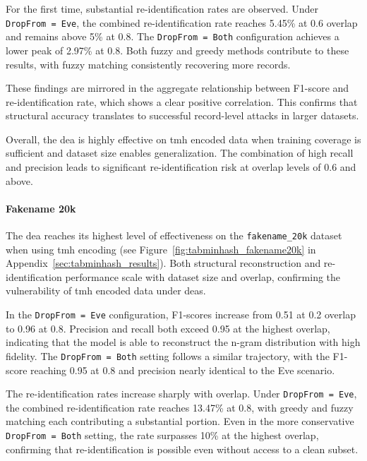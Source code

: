 For the first time, substantial re-identification rates are observed.
Under \texttt{DropFrom = Eve}, the combined re-identification rate reaches 5.45\% at 0.6 overlap and remains above 5\% at 0.8.
The \texttt{DropFrom = Both} configuration achieves a lower peak of 2.97\% at 0.8.
Both fuzzy and greedy methods contribute to these results, with fuzzy matching consistently recovering more records.

These findings are mirrored in the aggregate relationship between F1-score and re-identification rate, which shows a clear positive correlation. This confirms that structural accuracy translates to successful record-level attacks in larger datasets.



Overall, the \ac{dea} is highly effective on \ac{tmh} encoded data when training coverage is sufficient and dataset size enables generalization.
The combination of high recall and precision leads to significant re-identification risk at overlap levels of 0.6 and above.


\paragraph{Fakename 20k}

The \ac{dea} reaches its highest level of effectiveness on the \texttt{fakename\_20k} dataset when using \ac{tmh} encoding (see Figure~\ref{fig:tabminhash_fakename20k} in Appendix~\ref{sec:tabminhash_results}).
Both structural reconstruction and re-identification performance scale with dataset size and overlap, confirming the vulnerability of \ac{tmh} encoded data under \ac{dea}s.

In the \texttt{DropFrom = Eve} configuration, F1-scores increase from 0.51 at 0.2 overlap to 0.96 at 0.8.
Precision and recall both exceed 0.95 at the highest overlap, indicating that the model is able to reconstruct the n-gram distribution with high fidelity.
The \texttt{DropFrom = Both} setting follows a similar trajectory, with the F1-score reaching 0.95 at 0.8 and precision nearly identical to the Eve scenario.

The re-identification rates increase sharply with overlap.
Under \texttt{DropFrom = Eve}, the combined re-identification rate reaches 13.47\% at 0.8, with greedy and fuzzy matching each contributing a substantial portion.
Even in the more conservative \texttt{DropFrom = Both} setting, the rate surpasses 10\% at the highest overlap, confirming that re-identification is possible even without access to a clean subset.

